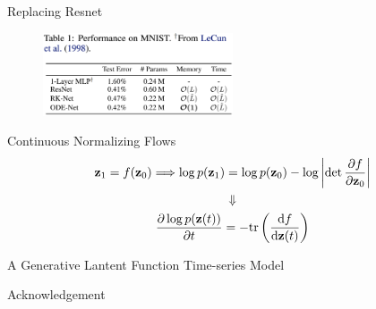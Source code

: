 \documentclass[12pt,aspectratio=169]{beamer}
\begin{document}
\begin{frame}{Replacing Resnet}
  \begin{figure}
    \begin{center}
      \includegraphics[width=0.5\textwidth]{figures/ODEnet.png}
    \end{center}
  \end{figure}
\end{frame}

\begin{frame}{Continuous Normalizing Flows}
  \begin{gather*}
    \textbf{\textrm{z}}_1 = f(\textbf{\textrm{z}}_0) \Longrightarrow \log p(\textbf{\textrm{z}}_1) =
    \log p(\textbf{\textrm{z}}_0) 
    - \log \left|\det \frac{\partial f}{\partial \textbf{\textrm{z}}_0}\right| \\
    \Downarrow \\
    \frac{\partial\log p(\textbf{\textrm{z}}(t))}{\partial t}=-\textrm{tr}\left(\frac{\textrm{d}f}
    {\textrm{d}\textbf{\textrm{z}}(t)}\right)
  \end{gather*}
\end{frame}

\begin{frame}{A Generative Lantent Function Time-series Model}
  
\end{frame}

\begin{frame}{Acknowledgement}
  \begin{center}
    \textcolor{gray}{\Huge{\centerline{}}}
  \end{center}
\end{frame}
\end{document}
